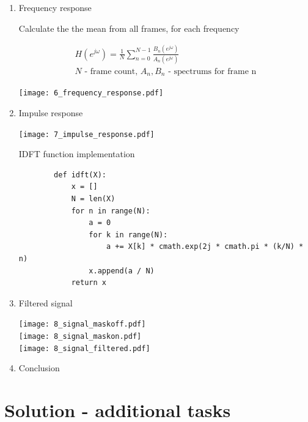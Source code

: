 \documentclass[a4paper, 11pt]{article}
\begin{document}
\begin{enumerate}
        \item
        Frequency response

        Calculate the the mean from all frames, for each frequency

        \begin{gather*}
            H(e^{j\omega}) = \frac{1}{N} \sum_{n=0}^{N-1} \frac{ B_n(e^{j\omega}) }{ A_n(e^{j\omega}) } \\
            N \text{ - frame count, } A_n, B_n \text{ - spectrums for frame n}
        \end{gather*}

        \texttt{[image: 6\_frequency\_response.pdf]}

        \item
        Impulse response

        \texttt{[image: 7\_impulse\_response.pdf]}

        IDFT function implementation

        \begin{verbatim}
        def idft(X):
            x = []
            N = len(X)
            for n in range(N):
                a = 0
                for k in range(N):
                    a += X[k] * cmath.exp(2j * cmath.pi * (k/N) * n)
                x.append(a / N)
            return x
        \end{verbatim}

        \newpage

        \item
        Filtered signal

        \texttt{[image: 8\_signal\_maskoff.pdf]} \\
        \texttt{[image: 8\_signal\_maskon.pdf]} \\
        \texttt{[image: 8\_signal\_filtered.pdf]}

        \item
        Conclusion

    \end{enumerate}

    \newpage
    \section*{Solution - additional tasks}
\end{document}
